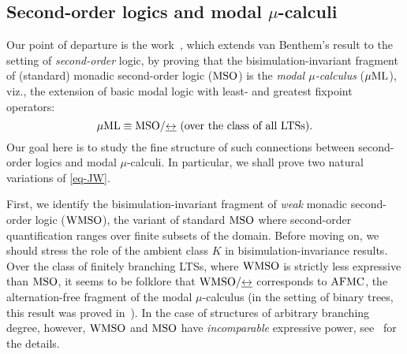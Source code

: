 \subsection{Second-order logics and modal $\mu$-calculi}

Our point of departure is the work~\cite{Jan96}, which extends van Benthem's
result to the setting of \emph{second-order} logic, by proving that the 
bisimulation-invariant fragment of (standard) monadic second-order logic 
($\mathrm{MSO}$) is the \emph{modal $\mu$-calculus} ($\mu\mathrm{ML}$), viz., the extension of
basic modal logic with least- and greatest fixpoint operators:
\begin{equation}
\label{eq-JW}
\MC \equiv \mso/{\bis} \text{ (over the class of all LTSs)}.
\end{equation}
Our goal here is to study the fine structure of such connections between 
second-order logics and modal $\mu$-calculi.
In particular, we shall prove two natural variations of \eqref{eq-JW}.

First, we identify the bisimulation-invariant fragment of \emph{weak} monadic 
second-order logic ($\mathrm{WMSO}$), the variant of standard $\mathrm{MSO}$ where second-order
quantification ranges over finite subsets of the domain.
Before moving on, we should stress the role of the ambient class $K$ in
bisimulation-invariance results.
Over the class of finitely branching LTSs, where $\mathrm{WMSO}$ is strictly less 
expressive than $\mathrm{MSO}$, it seems to be folklore that $\mathrm{WMSO}/{\mathrel{\underline{\leftrightarrow}}}$ corresponds
to $\mathrm{AFMC}$, the alternation-free fragment of the modal $\mu$-calculus
(in the setting of binary trees, this result was proved in~\cite{ArnoldN01}).
In the case of structures of arbitrary branching degree, however, $\mathrm{WMSO}$ and
$\mathrm{MSO}$ have \emph{incomparable} expressive power, see~\cite{CateF11} for the
details.

